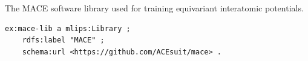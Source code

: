 The MACE software library used for training equivariant interatomic potentials.
\begin{lstlisting}[language=turtle]
ex:mace-lib a mlips:Library ;
    rdfs:label "MACE" ;
    schema:url <https://github.com/ACEsuit/mace> .
\end{lstlisting}
